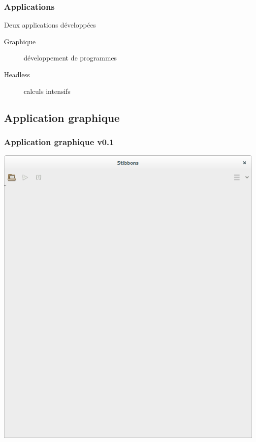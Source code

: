 \begin{frame}
\frametitle{Applications}
Deux applications développées
\begin{description}
	\item [Graphique] développement de programmes
	\item [Headless] calculs intensifs
\end{description}
\end{frame}

\subsection{Application graphique}

\begin{frame}
\frametitle{Application graphique v0.1}
\begin{center}
\includegraphics[scale=0.16]{doc/report/screenshot/stibbons-0-1-1.png}
~~~~~~~~

\end{center}
\end{frame}
